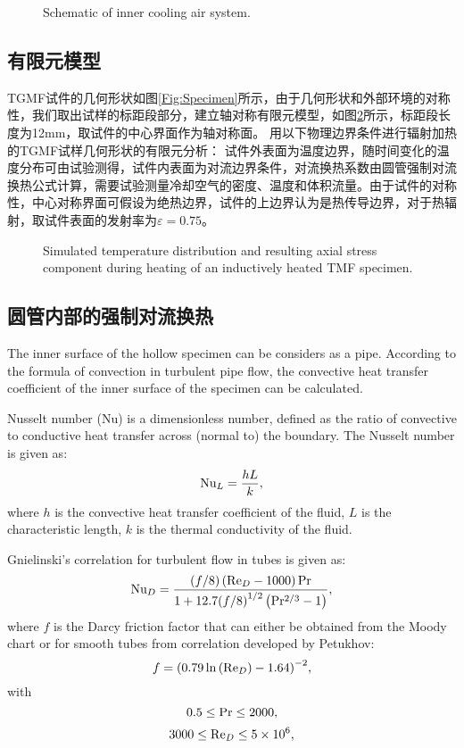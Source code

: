 \begin{figure}[!htp]
\caption{Schematic of inner cooling air system.}
\label{Fig:inner_cooling}
\end{figure}

\subsection{有限元模型}
TGMF试件的几何形状如图\ref{Fig:Specimen}所示，由于几何形状和外部环境的对称性，我们取出试样的标距段部分，建立轴对称有限元模型，如图\ref{Fig:FEM}所示，标距段长度为12mm，取试件的中心界面作为轴对称面。
用以下物理边界条件进行辐射加热的TGMF试样几何形状的有限元分析：
试件外表面为温度边界，随时间变化的温度分布可由试验测得，试件内表面为对流边界条件，对流换热系数由圆管强制对流换热公式计算，需要试验测量冷却空气的密度、温度和体积流量。由于试件的对称性，中心对称界面可假设为绝热边界，试件的上边界认为是热传导边界，对于热辐射，取试件表面的发射率为$\varepsilon=0.75$。

\begin{figure}[!htp]
\caption{Simulated temperature distribution and resulting axial stress component during heating of an inductively heated TMF specimen.}
\label{Fig:FEM}
\end{figure}

\subsection{圆管内部的强制对流换热}
The inner surface of the hollow specimen can be considers as a pipe.
According to the formula of convection in turbulent pipe flow, the convective heat transfer coefficient of the inner surface of the specimen can be calculated.

Nusselt number (Nu) is a dimensionless number, defined as the ratio of convective to conductive heat transfer across (normal to) the boundary.
The Nusselt number is given as:
\[{\rm{N}}{{\rm{u}}_L} = \frac{{hL}}{k},\]
where $h$ is the convective heat transfer coefficient of the fluid, $L$ is the characteristic length, $k$ is the thermal conductivity of the fluid.

Gnielinski's correlation for turbulent flow in tubes is given as:
\[{\rm{N}}{{\rm{u}}_D} = \frac{{\left( {f/8} \right)\left( {{\rm{R}}{{\rm{e}}_D} - 1000} \right){\rm{Pr}}}}{{1 + 12.7{{(f/8)}^{1/2}}\left( {{\rm{P}}{{\rm{r}}^{2/3}} - 1} \right)}},\]
where $f$ is the Darcy friction factor that can either be obtained from the Moody chart or for smooth tubes from correlation developed by Petukhov:
\[f = {\left( {0.79\ln \left( {{\rm{R}}{{\rm{e}}_D}} \right) - 1.64} \right)^{ - 2}},\]
with
\[0.5 \le {\rm{Pr}} \le 2000,\]
\[3000 \le {\rm{R}}{{\rm{e}}_D} \le 5 \times {10^6},\]

